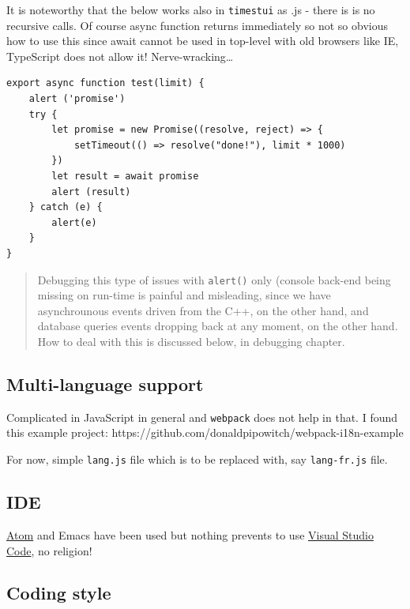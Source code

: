 \documentclass[11pt]{article}
\begin{document}
    It is noteworthy that the below works also in \texttt{timestui} as .js -
there is is no recursive calls. Of course async function returns
immediately so not so obvious how to use this since await cannot be used
in top-level with old browsers like IE, TypeScript does not allow it!
Nerve-wracking\ldots{}

    \begin{verbatim}
export async function test(limit) {
    alert ('promise')
    try {
        let promise = new Promise((resolve, reject) => {
            setTimeout(() => resolve("done!"), limit * 1000)
        })
        let result = await promise
        alert (result)
    } catch (e) {
        alert(e)
    }
}
\end{verbatim}

    \begin{quote}
Debugging this type of issues with \texttt{alert()} only (console
back-end being missing on run-time is painful and misleading, since we
have asynchrounous events driven from the C++, on the other hand, and
database queries events dropping back at any moment, on the other hand.
How to deal with this is discussed below, in debugging chapter.
\end{quote}

    \hypertarget{multi-language-support}{%
\subsection{Multi-language support}\label{multi-language-support}}

    Complicated in JavaScript in general and \texttt{webpack} does not help
in that. I found this example project:
https://github.com/donaldpipowitch/webpack-i18n-example

    For now, simple \texttt{lang.js} file which is to be replaced with, say
\texttt{lang-fr.js} file.

    \hypertarget{ide}{%
\subsection{IDE}\label{ide}}

    \href{https://atom.io}{Atom} and Emacs have been used but nothing
prevents to use \href{https://code.visualstudio.com}{Visual Studio
Code}, no religion!

    \hypertarget{coding-style}{%
\subsection{Coding style}\label{coding-style}}
\end{document}
